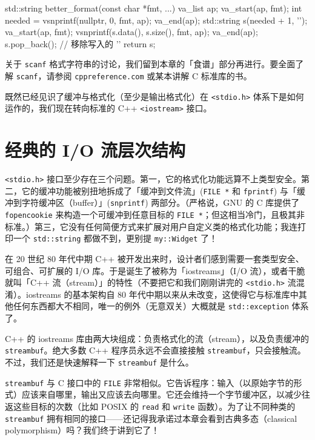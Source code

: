 \begin{codebox}[cpp]
    std::string better_format(const char *fmt, ...)
    {
      va_list ap;
      va_start(ap, fmt);
      int needed = vsnprintf(nullptr, 0, fmt, ap);
      va_end(ap);
      std::string s(needed + 1, '\0');
      va_start(ap, fmt);
      vsnprintf(s.data(), s.size(), fmt, ap);
      va_end(ap);
      s.pop_back(); // 移除写入的 '\0'
      return s;
    }
\end{codebox}

关于 \texttt{scanf} 格式字符串的讨论，我们留到本章的「食谱」部分再进行。要全面了解 \texttt{scanf}，请参阅 \texttt{cppreference.\allowbreak{}com} 或某本讲解 C 标准库的书。

既然已经见识了缓冲与格式化（至少是输出格式化）在 \texttt{<stdio.\allowbreak{}h>\allowbreak{}} 体系下是如何运作的，我们现在转向标准的 C++ \texttt{<iostream>\allowbreak{}} 接口。

\section{经典的 I/O 流层次结构}

\texttt{<stdio.\allowbreak{}h>\allowbreak{}} 接口至少存在三个问题。第一，它的格式化功能远算不上类型安全。第二，它的缓冲功能被别扭地拆成了「缓冲到文件流」(\texttt{FILE *} 和 \texttt{fprintf}) 与「缓冲到字符缓冲区（buffer）」(\texttt{snprintf}) 两部分。（严格说，GNU 的 C 库提供了 \texttt{fopencookie} 来构造一个可缓冲到任意目标的 \texttt{FILE *}；但这相当冷门，且极其非标准。）第三，它没有任何简便方式来扩展对用户自定义类的格式化功能；我连打印一个 \texttt{std::\allowbreak{}string} 都做不到，更别提 \texttt{my::\allowbreak{}Widget} 了！

在 20 世纪 80 年代中期 C++ 被开发出来时，设计者们感到需要一套类型安全、可组合、可扩展的 I/O 库。于是诞生了被称为「iostreams」（I/O 流），或者干脆就叫「C++ 流（stream）」的特性（不要把它和我们刚刚讲完的 \texttt{<stdio.\allowbreak{}h>\allowbreak{}} 流混淆）。iostreams 的基本架构自 80 年代中期以来从未改变，这使得它与标准库中其他任何东西都大不相同，唯一的例外（无意双关）大概就是 \texttt{std::\allowbreak{}exception} 体系了。

C++ 的 iostreams 库由两大块组成：负责格式化的流（stream），以及负责缓冲的 \texttt{streambuf}。绝大多数 C++ 程序员永远不会直接接触 \texttt{streambuf}，只会接触流。不过，我们还是快速解释一下 \texttt{streambuf} 是什么。

\texttt{streambuf} 与 C 接口中的 \texttt{FILE} 非常相似。它告诉程序：输入（以原始字节的形式）应该来自哪里，输出又应该去向哪里。它还会维持一个字节缓冲区，以减少往返这些目标的次数（比如 POSIX 的 \texttt{read} 和 \texttt{write} 函数）。为了让不同种类的 \texttt{streambuf} 拥有相同的接口——还记得我承诺过本章会看到古典多态（classical polymorphism）吗？我们终于讲到它了！

